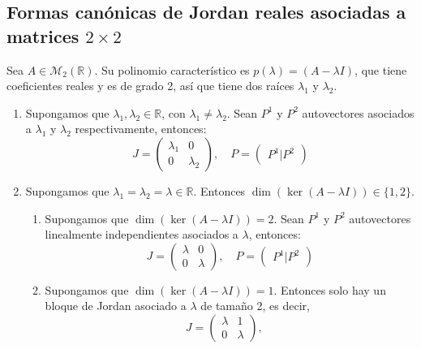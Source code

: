 \subsection*{Formas canónicas de Jordan reales asociadas a matrices $2 \times 2$}
Sea $A \in \mathcal{M}_2(\mathbb{R})$.
Su polinomio característico es $p(\lambda) = (A - \lambda I)$, que tiene coeficientes reales y es de grado 2, así que tiene dos raíces $\lambda_1$ y $\lambda_2$.
\begin{enumerate}
    \item Supongamos que $\lambda_1, \lambda_2 \in \mathbb{R}$, con $\lambda_1 \neq \lambda_2$.
          Sean $P^1$ y $P^2$ autovectores asociados a $\lambda_1$ y $\lambda_2$ respectivamente, entonces:
          $$J = \begin{pmatrix}
                  \lambda_1 & 0         \\
                  0         & \lambda_2
              \end{pmatrix}, \quad
              P = \begin{pmatrix}
                  P^1 | P^2
              \end{pmatrix}$$
    \item Supongamos que $\lambda_1 = \lambda_2 = \lambda \in \mathbb{R}$.
          Entonces $\dim(\ker(A - \lambda I)) \in \{1, 2\}$.
          \begin{enumerate}
              \item Supongamos que $\dim(\ker(A - \lambda I)) = 2$.
                    Sean $P^1$ y $P^2$ autovectores linealmente independientes asociados a $\lambda$, entonces:
                    $$J = \begin{pmatrix}
                            \lambda & 0       \\
                            0       & \lambda
                        \end{pmatrix}, \quad
                        P = \begin{pmatrix}
                            P^1 | P^2
                        \end{pmatrix}$$
              \item Supongamos que $\dim(\ker(A - \lambda I)) = 1$.
                    Entonces solo hay un bloque de Jordan asociado a $\lambda$ de tamaño 2, es decir,
                    $$J = \begin{pmatrix}
                            \lambda & 1       \\
                            0       & \lambda
                        \end{pmatrix}, \quad
$$
\end{enumerate}
\end{enumerate}

